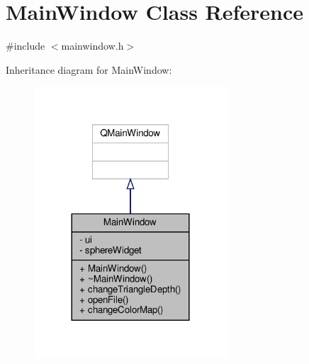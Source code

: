 \hypertarget{class_main_window}{}\section{Main\+Window Class Reference}
\label{class_main_window}


{\ttfamily \#include $<$mainwindow.\+h$>$}



Inheritance diagram for Main\+Window\+:\nopagebreak
\begin{figure}[H]
\begin{center}
\leavevmode
\includegraphics[width=204pt]{de/d4b/class_main_window__inherit__graph}
\end{center}
\end{figure}


